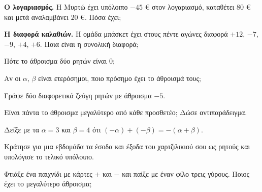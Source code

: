 \ex \textbf{Ο λογαριασμός.} Η Μυρτώ έχει υπόλοιπο $-45$ € στον λογαριασμό, καταθέτει $80$ € και μετά αναλαμβάνει $20$ €. Πόσα έχει;

\ex \textbf{Η διαφορά καλαθιών.} Η ομάδα μπάσκετ έχει στους πέντε αγώνες διαφορά $+12$, $-7$, $-9$, $+4$, $+6$. Ποια είναι η συνολική διαφορά;


\ex Πότε το άθροισμα δύο ρητών είναι $0$;

\ex Αν οι $\alpha,\,\beta$ είναι ετερόσημοι, ποιο πρόσημο έχει το άθροισμά τους;

\ex Γράψε δύο διαφορετικά ζεύγη ρητών με άθροισμα $-5$.

\ex Είναι πάντα το άθροισμα μεγαλύτερο από κάθε προσθετέο; Δώσε αντιπαράδειγμα.

\ex Δείξε με τα $\alpha=3$ και $\beta=4$ ότι $(-\alpha)+(-\beta)=-(\alpha+\beta)$.


\ex Κράτησε για μια εβδομάδα τα έσοδα και έξοδα του χαρτζιλικιού σου ως ρητούς και υπολόγισε το τελικό υπόλοιπο.

\ex Φτιάξε ένα παιχνίδι με κάρτες $+$ και $-$ και παίξε με έναν φίλο τρεις γύρους. Ποιος έχει το μεγαλύτερο άθροισμα;
